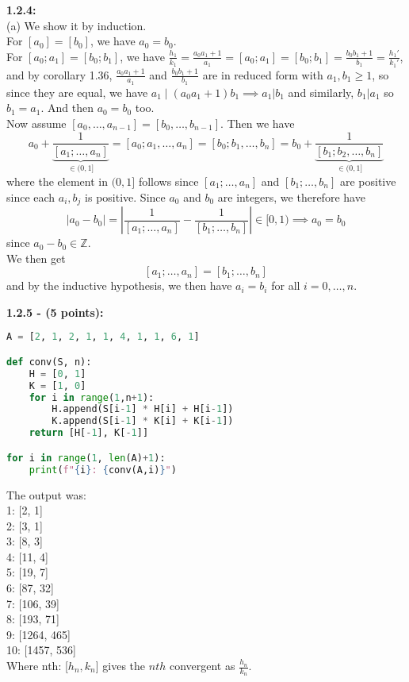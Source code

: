 \documentclass[a4paper]{article}
\begin{document}
     \textbf{1.2.4:}\\
     (a) We show it by induction.\\
     For $\left[ a_0 \right] = \left[ b_0 \right] $, we have $a_0 = b_0$.\\
     For $\left[ a_0; a_1 \right] = \left[ b_0; b_1 \right] $, we have
     $\frac{h_1}{k_1} =\frac{a_0 a_1 + 1}{a_1} = \left[ a_0; a_1 \right] 
     = \left[ b_0; b_1 \right] = \frac{b_0 b_1 + 1}{b_1} = \frac{h_1'}{k_1'}$, and by corollary
     1.36, $\frac{a_0 a_1 + 1}{a_1}$ and $\frac{b_0 b_1 + 1}{b_1}$ are in
       reduced form with $a_1, b_1 \ge 1$, so since they are equal, we have
       $a_1  \mid \left( a_0 a_1 +1 \right) b_1 \implies a_1 | b_1$ and
       similarly, $b_1 | a_1$ so $b_1 = a_1$. And then $a_0 = b_0$ too.\\
       \linebreak
       Now assume $\left[ a_0, \ldots, a_{n-1} \right] = \left[ b_0, \ldots,
       b_{n-1} \right] $. Then
       we have
       \[
           a_0 + \underbrace{\frac{1}{\left[ a_1; \ldots, a_n \right] }}_{\in
           (0,1]}
       = \left[ a_0; a_1, \ldots, a_n \right] 
       = \left[ b_0; b_1, \ldots, b_n \right] 
       = b_0 + \underbrace{\frac{1}{\left[ b_1; b_2, \ldots, b_n \right]
       }}_{\in (0,1]}
       \] 
       where the element in $(0,1]$ follows since
       $\left[ a_1; \ldots, a_n \right] $ and $\left[ b_1; \ldots, b_n \right]
       $ are
       positive since each $a_i, b_j$ is positive. Since $a_0$ and $b_0$ are
       integers, we therefore have
       \[
       \left| a_0 - b_0 \right| = \left| \frac{1}{\left[ a_1; \ldots, a_n \right] }
       - \frac{1}{\left[ b_1; \ldots, b_n \right] }\right| \in [0,1)
       \implies a_0 = b_0
       \] 
       since $a_0- b_0 \in \mathbb{Z}$.\\
       \linebreak
       We then get
       \[
       \left[ a_1; \ldots, a_n \right] = \left[ b_1; \ldots, b_n \right] 
       \] 
       and by the inductive hypothesis, we then have
       $a_i = b_i$ for all $i = 0, \ldots, n$.

\textbf{1.2.5 - (5 points):}

\begin{lstlisting}[language=Python]
A = [2, 1, 2, 1, 1, 4, 1, 1, 6, 1]

def conv(S, n):
    H = [0, 1]
    K = [1, 0]
    for i in range(1,n+1):
        H.append(S[i-1] * H[i] + H[i-1])
        K.append(S[i-1] * K[i] + K[i-1])
    return [H[-1], K[-1]]

for i in range(1, len(A)+1):
    print(f"{i}: {conv(A,i)}")
\end{lstlisting}

The output was:\\
1: [2, 1]\\
2: [3, 1]\\
3: [8, 3]\\
4: [11, 4]\\
5: [19, 7]\\
6: [87, 32]\\
7: [106, 39]\\
8: [193, 71]\\
9: [1264, 465]\\
10: [1457, 536]\\
\linebreak
Where nth: [$h_n, k_n$] gives the
$nth$ convergent as $\frac{h_n}{k_n}$.

       
       
\end{document}
